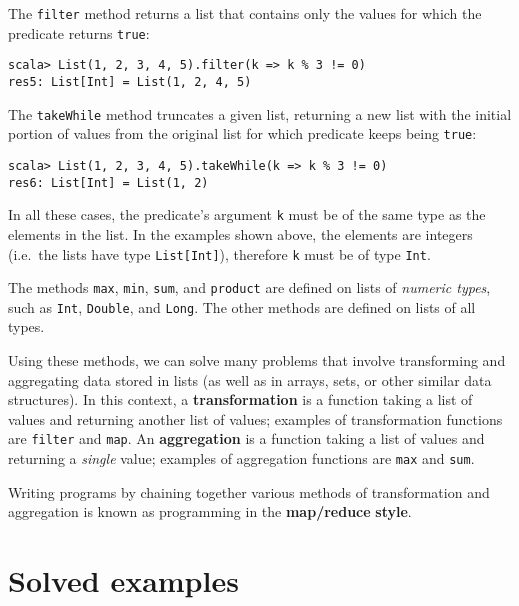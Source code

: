 The \lstinline!filter! method returns a list that contains only the
values for which the predicate returns \texttt{}\lstinline!true!:

\begin{lstlisting}
scala> List(1, 2, 3, 4, 5).filter(k => k % 3 != 0)
res5: List[Int] = List(1, 2, 4, 5)
\end{lstlisting}

The \texttt{}\lstinline!takeWhile! method truncates a given list,
returning a new list with the initial portion of values from the original
list for which predicate keeps being \lstinline!true!:
\begin{lstlisting}
scala> List(1, 2, 3, 4, 5).takeWhile(k => k % 3 != 0)
res6: List[Int] = List(1, 2)
\end{lstlisting}

In all these cases, the predicate\textsf{'}s argument \lstinline!k! must be
of the same type as the elements in the list. In the examples shown
above, the elements are integers (i.e.\ the lists have type \lstinline!List[Int]!),
therefore \texttt{}\lstinline!k! must be of type \lstinline!Int!.

The methods \lstinline!max!, \lstinline!min!, \lstinline!sum!,
and \texttt{}\lstinline!product! are defined on lists of \emph{numeric
types}, such as \lstinline!Int!, \lstinline!Double!, and \lstinline!Long!.
The other methods are defined on lists of all types.

Using these methods, we can solve many problems that involve transforming
and aggregating data stored in lists (as well as in arrays, sets,
or other similar data structures). In this context, a \textbf{transformation}
is a function taking a list of values and returning another list of
values; examples of transformation functions are \texttt{}\lstinline!filter!
and \lstinline!map!. An \textbf{aggregation}
is a function taking a list of values and returning a \emph{single}
value; examples of aggregation functions are \texttt{}\lstinline!max!
and \lstinline!sum!.

Writing programs by chaining together various methods of transformation
and aggregation is known as programming in the \textbf{map/reduce}
\textbf{style}.

\section{Solved examples}


